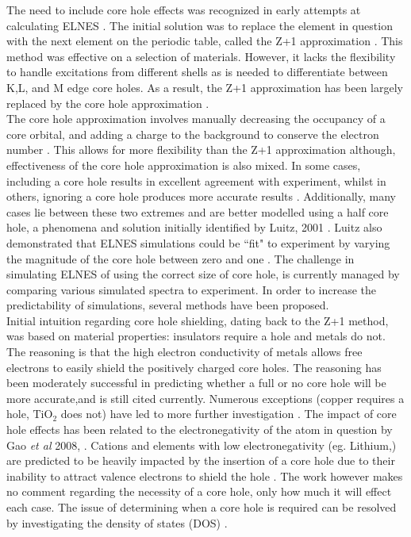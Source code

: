 The need to include core hole effects was recognized in early attempts at calculating ELNES  \cite{lee_new_1977}.  The initial solution was to replace the element in question with the next element on the periodic table, called the Z+1 approximation \cite{lee_new_1977}.  This method was effective on a selection of materials.  However, it lacks the flexibility to handle excitations from different shells as is needed to differentiate between K,L, and M edge core holes.  As a result, the Z+1 approximation has been largely replaced by the core hole approximation \cite{hebert_practical_2007}. \\

The core hole approximation involves manually decreasing the occupancy of a core orbital, and adding a charge to the background to conserve the electron number \cite{wien2k}. This allows for more flexibility than the Z+1 approximation although, effectiveness of the core hole approximation is also mixed.  In some cases, including a core hole results in excellent agreement with experiment, whilst in others, ignoring a core hole produces more accurate results \cite{hebert_practical_2007}. Additionally, many cases lie between these two extremes and are better modelled using a half core hole, a phenomena and solution initially identified by Luitz, 2001 \cite{luitz_partial_2001}. Luitz also demonstrated that ELNES simulations could be ``fit" to experiment by varying the magnitude of the core hole between zero and one \cite{luitz_partial_2001}.  The challenge in simulating ELNES of using the correct size of core hole, is currently managed by comparing various simulated spectra to experiment.  In order to increase the predictability of simulations, several methods have been proposed. \\

Initial intuition regarding core hole shielding, dating back to the Z+1 method, was based on material properties: insulators require a hole and metals do not.  The reasoning is that the high electron conductivity of metals allows free electrons to easily shield the positively charged core holes. The reasoning has been moderately successful in predicting whether a full or no core hole will be more accurate,and is still cited currently. Numerous exceptions (copper requires a hole, $ \mathrm{TiO_2} $ does not) have led to more further investigation \cite{luitz_partial_2001, mauchamp_core-hole_2009,gao_theory_2008,soininen_scheme_2001}.  The impact of core hole effects has been related to the electronegativity of the atom in question by Gao \textit{et al} 2008, \cite{gao_theory_2008}.  Cations and elements with low electronegativity (eg. Lithium,) are predicted to be heavily impacted by the insertion of a core hole due to their inability to attract valence electrons to shield the hole \cite{gao_theory_2008}. The work however makes no comment regarding the necessity of a core hole, only how much it will effect each case.  The issue of determining when a core hole is required can be resolved by investigating the density of states (DOS) \cite{mauchamp_core-hole_2009}.\\


